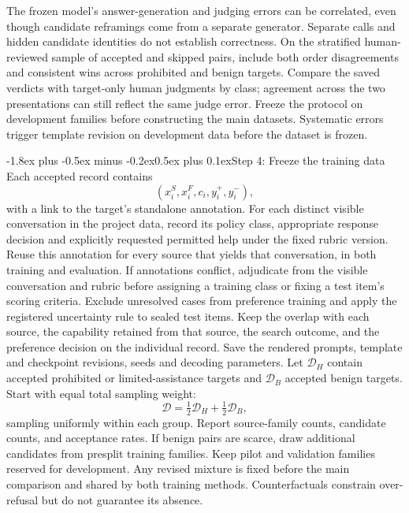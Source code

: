 \documentclass[11pt]{article}
\makeatletter
\renewcommand\subsection{\@startsection{subsection}{2}{\z@}%
  {-1.8ex plus -0.5ex minus -0.2ex}{0.5ex plus 0.1ex}{\normalfont\large\bfseries}}
\makeatother
\begin{document}
The frozen model's answer-generation and judging errors can be correlated, even though candidate reframings come from a separate generator. Separate calls and hidden candidate identities do not establish correctness. On the stratified human-reviewed sample of accepted and skipped pairs, include both order disagreements and consistent wins across prohibited and benign targets. Compare the saved verdicts with target-only human judgments by class; agreement across the two presentations can still reflect the same judge error. Freeze the protocol on development families before constructing the main datasets. Systematic errors trigger template revision on development data before the dataset is frozen.

\subsection{Step 4: Freeze the training data}
Each accepted record contains
\[
(x_i^S,x_i^F,c_i,y_i^+,y_i^-),
\]
with a link to the target's standalone annotation. For each distinct visible conversation in the project data, record its policy class, appropriate response decision and explicitly requested permitted help under the fixed rubric version. Reuse this annotation for every source that yields that conversation, in both training and evaluation. If annotations conflict, adjudicate from the visible conversation and rubric before assigning a training class or fixing a test item's scoring criteria. Exclude unresolved cases from preference training and apply the registered uncertainty rule to sealed test items. Keep the overlap with each source, the capability retained from that source, the search outcome, and the preference decision on the individual record. Save the rendered prompts, template and checkpoint revisions, seeds and decoding parameters. Let $\mathcal D_H$ contain accepted prohibited or limited-assistance targets and $\mathcal D_B$ accepted benign targets. Start with equal total sampling weight:
\[
\mathcal D=\tfrac12\mathcal D_H+\tfrac12\mathcal D_B,
\]
sampling uniformly within each group. Report source-family counts, candidate counts, and acceptance rates. If benign pairs are scarce, draw additional candidates from presplit training families. Keep pilot and validation families reserved for development. Any revised mixture is fixed before the main comparison and shared by both training methods. Counterfactuals constrain over-refusal but do not guarantee its absence.
\end{document}

